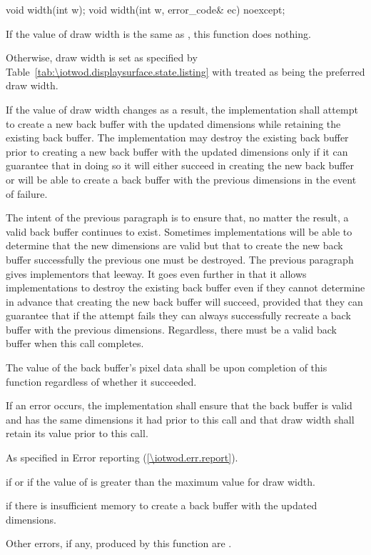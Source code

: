 \begin{itemdecl}
void width(int w);
void width(int w, error_code& ec) noexcept;
\end{itemdecl}
\begin{itemdescr}
\pnum
\effects
If the value of draw width is the same as , this function does nothing.

\pnum
Otherwise, draw width is set as specified by Table~\ref{tab:\iotwod.displaysurface.state.listing} with  treated as being the preferred draw width.

\pnum
If the value of draw width changes as a result, the implementation shall attempt to create a new back buffer with the updated dimensions while retaining the existing back buffer. The implementation may destroy the existing back buffer prior to creating a new back buffer with the updated dimensions only if it can guarantee that in doing so it will either succeed in creating the new back buffer or will be able to create a back buffer with the previous dimensions in the event of failure.

\pnum
\begin{note}
The intent of the previous paragraph is to ensure that, no matter the result, a valid back buffer continues to exist. Sometimes implementations will be able to determine that the new dimensions are valid but that to create the new back buffer successfully the previous one must be destroyed. The previous paragraph gives implementors that leeway. It goes even further in that it allows implementations to destroy the existing back buffer even if they cannot determine in advance that creating the new back buffer will succeed, provided that they can guarantee that if the attempt fails they can always successfully recreate a back buffer with the previous dimensions. Regardless, there must be a valid back buffer when this call completes.
\end{note}

\pnum
The value of the back buffer's pixel data shall be \unspecnorm upon completion of this function regardless of whether it succeeded.

\pnum
If an error occurs, the implementation shall ensure that the back buffer is valid and has the same dimensions it had prior to this call and that draw width shall retain its value prior to this call.

\pnum
\throws
As specified in Error reporting (\ref{\iotwod.err.report}).

\pnum
\errors
{} if  or if the value of  is greater than the maximum value for draw width.

 if there is insufficient memory to create a back buffer with the updated dimensions.

Other errors, if any, produced by this function are .
\end{itemdescr}

